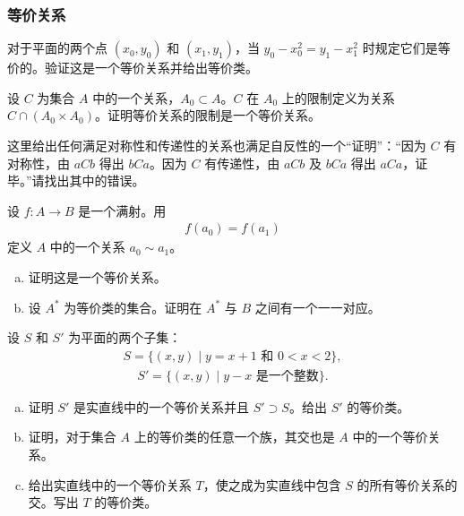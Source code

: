 \documentclass[../../main.tex]{subfiles}
\begin{document}
\subsubsection*{等价关系}

\begin{exercise}\label{exercise:ch01-关系-1}
对于平面的两个点 $(x_{0}, y_{0})$ 和 $(x_{1}, y_{1})$，当 $y_{0} - x_{0}^{2} = y_{1} - x_{1}^{2}$ 时规定它们是等价的。验证这是一个等价关系并给出等价类。
\end{exercise}

\begin{exercise}\label{exercise:ch01-关系-2}
设 $C$ 为集合 $A$ 中的一个关系，$A_{0} \subset A$。$C$ 在 $A_{0}$ 上的限制定义为关系 $C \cap (A_{0} \times A_{0})$。证明等价关系的限制是一个等价关系。
\end{exercise}

\begin{exercise}\label{exercise:ch01-关系-3}
这里给出任何满足对称性和传递性的关系也满足自反性的一个“证明”：“因为 $C$ 有对称性，由 $aCb$ 得出 $bCa$。因为 $C$ 有传递性，由 $aCb$ 及 $bCa$ 得出 $aCa$，证毕。”请找出其中的错误。
\end{exercise}

\begin{exercise}\label{exercise:ch01-关系-4}
设 $f: A \longrightarrow B$ 是一个满射。用
\begin{align*}
f(a_{0}) = f(a_{1})
\end{align*}
定义 $A$ 中的一个关系 $a_{0} \sim a_{1}$。
\begin{enumerate}[(a)]
\item 证明这是一个等价关系。
\item 设 $A^{\ast}$ 为等价类的集合。证明在 $A^{\ast}$ 与 $B$ 之间有一个一一对应。
\end{enumerate}
\end{exercise}

\begin{exercise}\label{exercise:ch01-关系-5}
设 $S$ 和 $S'$ 为平面的两个子集：
\begin{align*}
S = \{(x, y) \mid y = x + 1 \text{ 和 } 0 < x < 2\},
\end{align*}
\begin{align*}
S' = \{(x, y) \mid y - x \text{ 是一个整数}\}.
\end{align*}
\begin{enumerate}[(a)]
\item 证明 $S'$ 是实直线中的一个等价关系并且 $S' \supset S$。给出 $S'$ 的等价类。
\item 证明，对于集合 $A$ 上的等价类的任意一个族，其交也是 $A$ 中的一个等价关系。
\item 给出实直线中的一个等价关系 $T$，使之成为实直线中包含 $S$ 的所有等价关系的交。写出 $T$ 的等价类。
\end{enumerate}
\end{exercise}
\end{document}
